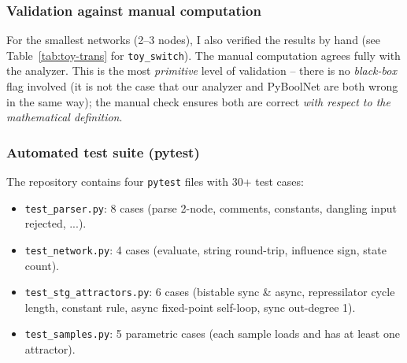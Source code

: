 \documentclass[oneside,final]{hcmut-report}
\begin{document}
\subsubsection{Validation against manual computation}

For the smallest networks (2--3 nodes), I also verified the results by hand (see Table~\ref{tab:toy-trans} for \texttt{toy\_switch}). The manual computation agrees fully with the analyzer. This is the most \textit{primitive} level of validation -- there is no \textit{black-box} flag involved (it is not the case that our analyzer and PyBoolNet are both wrong in the same way); the manual check ensures both are correct \textit{with respect to the mathematical definition}.

\subsubsection{Automated test suite (pytest)}

The repository contains four \texttt{pytest} files with 30+ test cases:

\begin{itemize}[leftmargin=*]
    \item \texttt{test\_parser.py}: 8 cases (parse 2-node, comments, constants, dangling input rejected, ...).
    \item \texttt{test\_network.py}: 4 cases (evaluate, string round-trip, influence sign, state count).
    \item \texttt{test\_stg\_attractors.py}: 6 cases (bistable sync \& async, repressilator cycle length, constant rule, async fixed-point self-loop, sync out-degree 1).
    \item \texttt{test\_samples.py}: 5 parametric cases (each sample loads and has at least one attractor).
\end{itemize}
\end{document}
